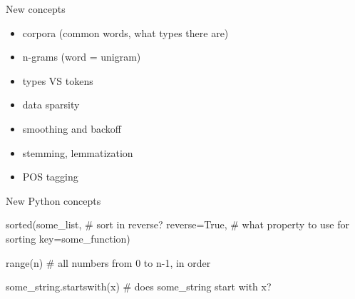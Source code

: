 \documentclass[professionalfonts, xcolor={usenames,svgnames,x11names,table}]{beamer}
\begin{document}
\begin{frame}[fragile]{New concepts}
    \begin{itemize}
        \item corpora (common words, what types there are)
        \item n-grams (word = unigram)
        \item types VS tokens
        \item data sparsity
        \item smoothing and backoff
        \item stemming, lemmatization
        \item POS tagging
    \end{itemize}
\end{frame}

\begin{frame}[fragile]{New Python concepts}
    \begin{pythoncode}
        sorted(some_list,
               # sort in reverse?
               reverse=True, 
               # what property to use for sorting
               key=some_function)

        range(n)  # all numbers from 0 to n-1, in order

        some_string.startswith(x)  # does some_string start with x?
    \end{pythoncode}
\end{frame}
\end{document}

